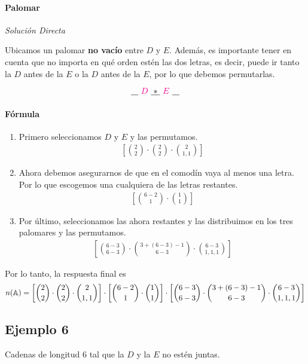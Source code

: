 \paragraph{Palomar}
\textit{Solución Directa}

Ubicamos un palomar \textbf{no vacío} entre $D$ y $E$. Además, es importante tener en cuenta que no importa en qué orden estén las dos letras, es decir, puede ir tanto la $D$ antes de la $E$ o la $D$ antes de la $E$, por lo que debemos permutarlas.

\begin{equation*}
~\underline{\hspace{0.3cm}}~ {\color{magenta}D} ~\underline{\hspace{0.1cm}*\hspace{0.1cm}}~  {\color{magenta}E} ~\underline{\hspace{0.3cm}}~
\end{equation*}

\paragraph{Fórmula}
\begin{enumerate}
\item Primero seleccionamos $D$ y $E$ y las permutamos.
\begin{align*}
\left[\binom{2}{2}\cdot\binom{2}{2}\cdot\binom{2}{1,1}\right]
\end{align*}
\item Ahora debemos asegurarnos de que en el comodín vaya al menos una letra. Por lo que escogemos una cualquiera de las letras restantes.
\begin{align*}
\left[\binom{6-2}{1}\cdot\binom{1}{1}\right]
\end{align*}
\item Por último, seleccionamos las ahora restantes y las distribuimos en los tres palomares y las permutamos.
\begin{align*}
\left[\binom{6-3}{6-3}\cdot\binom{3+(6-3)-1}{6-3}\cdot\binom{6-3}{1,1,1}\right]
\end{align*}
\end{enumerate}
Por lo tanto, la respuesta final es
\begin{align*}
n(\mathbb{A})=\left[\binom{2}{2}\cdot\binom{2}{2}\cdot\binom{2}{1,1}\right]\cdot\left[\binom{6-2}{1}\cdot\binom{1}{1}\right]\cdot\left[\binom{6-3}{6-3}\cdot\binom{3+(6-3)-1}{6-3}\cdot\binom{6-3}{1,1,1}\right]
\end{align*}

\subsection{Ejemplo 6}
Cadenas de longitud 6 tal que la $D$ y la $E$ no estén juntas.


